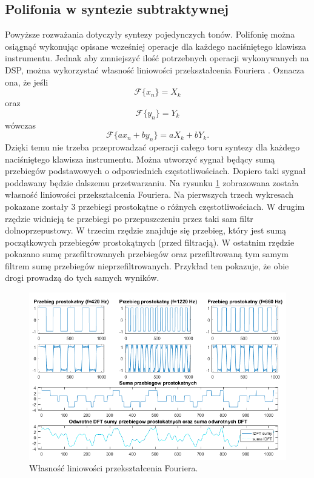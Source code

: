 \subsection{Polifonia w syntezie subtraktywnej}
Powyższe rozważania dotyczyły syntezy pojedynczych tonów. Polifonię można osiągnąć wykonując opisane wcześniej operacje dla każdego naciśniętego klawisza instrumentu. Jednak aby zmniejszyć ilość potrzebnych operacji wykonywanych na DSP, można wykorzystać własność liniowości przekształcenia Fouriera \cite{schafer}. Oznacza ona, że jeśli
 \begin{equation} \label{equ:sub_5}
 \mathcal{F}\{x_n\} = X_k
 \end{equation}
 oraz 
  \begin{equation} \label{equ:sub_6}
 \mathcal{F}\{y_n\} = Y_k
 \end{equation}
 wówczas
  \begin{equation} \label{equ:sub_7}
\mathcal{F}\{ax_n + by_n\} = aX_k + bY_k.
\end{equation} 
Dzięki temu nie trzeba przeprowadzać operacji całego toru syntezy dla każdego naciśniętego klawisza instrumentu. Można utworzyć sygnał będący sumą przebiegów podstawowych o odpowiednich częstotliwościach. Dopiero taki sygnał poddawany będzie dalszemu przetwarzaniu. Na rysunku \ref{rys:sub_linearity}	zobrazowana została własność liniowości przekształcenia Fouriera. Na pierwszych trzech wykresach pokazane zostały 3 przebiegi prostokątne o różnych częstotliwościach. W drugim rzędzie widnieją te przebiegi po przepuszczeniu przez taki sam filtr dolnoprzepustowy. W trzecim rzędzie znajduje się przebieg, który jest sumą początkowych przebiegów prostokątnych (przed filtracją). W ostatnim rzędzie pokazano sumę przefiltrowanych przebiegów oraz przefiltrowaną tym samym filtrem sumę przebiegów nieprzefiltrowanych. Przykład ten pokazuje, że obie drogi prowadzą do tych samych wyników.
\begin{figure}[H]
	\centering
	\includegraphics[width=16cm]{grafiki/sub_linearity}
	\captionsetup{justification=centering}
	\caption{Własność liniowości przekształcenia Fouriera.}
	\label{rys:sub_linearity}
\end{figure}


